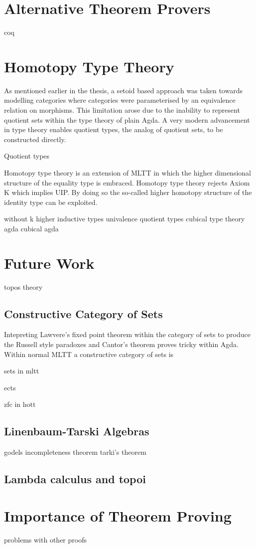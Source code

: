 \section{Alternative Theorem Provers}
coq
\section{Homotopy Type Theory}
As mentioned earlier in the thesis, a setoid based approach was taken towards
modelling categories where categories were parameterised by an equivalence
relation on morphisms. This limitation arose due to the inability to represent
quotient sets within the type theory of plain Agda. A very modern advancement in
type theory enables quotient types, the analog of quotient sets, to be
constructed directly.

Quotient types

Homotopy type theory is an extension of MLTT in which the
higher dimensional structure of the equality type is embraced. Homotopy type
theory rejects Axiom K which implies UIP. By doing so the so-called higher
homotopy structure of the identity type can be exploited.

without k
higher inductive types
univalence
quotient types
cubical type theory agda
cubical agda

\section{Future Work}
topos theory

\subsection{Constructive Category of Sets}
Intepreting Lawvere's fixed point theorem within the category of sets to
produce the Russell style paradoxes and Cantor's theorem proves tricky within
Agda. Within normal MLTT a constructive category of sets is 

sets in mltt

ects

zfc in hott

\subsection{Linenbaum-Tarski Algebras}
godels incompleteness theorem
tarki's theorem
\subsection{Lambda calculus and topoi}
\section{Importance of Theorem Proving}
problems with other proofs
